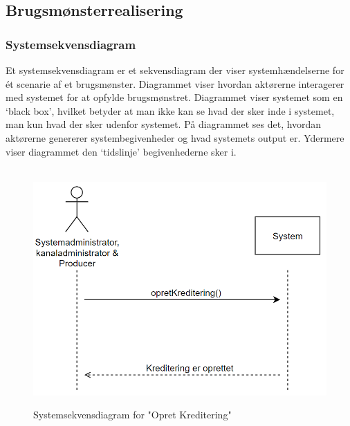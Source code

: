 \subsection{Brugsmønsterrealisering}

\subsubsection{Systemsekvensdiagram}
Et systemsekvensdiagram er et sekvensdiagram der viser systemhændelserne for ét scenarie af et brugsmønster. Diagrammet viser hvordan aktørerne interagerer med systemet for at opfylde brugsmønstret. Diagrammet viser systemet som en ‘black box’, hvilket betyder at man ikke kan se
hvad der sker inde i systemet, man kun hvad der sker udenfor systemet. På diagrammet ses det, hvordan aktørerne genererer systembegivenheder og hvad systemets output er. Ydermere viser diagrammet den ‘tidslinje’ begivenhederne sker i. \\
 \\


\begin{figure}[H]
\centering
\includegraphics[scale=0.40]{figures/systemsekvensdiagrammer/opretKreditering.PNG} \\
\caption{Systemsekvensdiagram for "Opret Kreditering"}
\label{fig:systemsekvensdiagram opretKreditering}
\end{figure}


 \\

